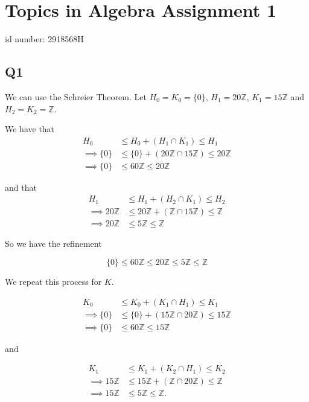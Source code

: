 \documentclass{amsart}
\begin{document}
    \section*{Topics in Algebra Assignment 1} 
    id number: 2918568H
    \hrulefill
    \subsection*{Q1} 
    We can use the Schreier Theorem. Let $H_0 = K_0 = \{0\}$, $H_1 = 20\mathbb{Z}$, $K_1 = 15\mathbb{Z}$ and $H_2 = K_2 = \mathbb{Z}$.

    We have that
    \begin{align*}
        H_0 &\leq H_0 + (H_1 \cap K_1) \leq H_1 \\
        \implies \{0\} &\leq \{0\}+ (20\mathbb{Z} \cap 15\mathbb{Z}) \leq 20\mathbb{Z} \\
        \implies \{0\} &\leq 60\mathbb{Z} \leq 20\mathbb{Z}
    \end{align*}

    and that 
    \begin{align*}
        H_1 &\leq H_1 + (H_2 \cap K_1) \leq H_2 \\
        \implies 20\mathbb{Z} &\leq 20\mathbb{Z} + (\mathbb{Z} \cap 15\mathbb{Z}) \leq \mathbb{Z} \\
        \implies 20\mathbb{Z} &\leq 5\mathbb{Z} \leq \mathbb{Z}
    \end{align*}

    So we have the refinement

    \[
        \{0\} \leq 60\mathbb{Z} \leq 20\mathbb{Z} \leq 5\mathbb{Z} \leq \mathbb{Z}
    \]

    We repeat this process for $K$.

    \begin{align*}
        K_0 &\leq K_0 + (K_1 \cap H_1) \leq K_1 \\
        \implies \{0\} &\leq \{0\}+ (15\mathbb{Z} \cap 20\mathbb{Z}) \leq 15\mathbb{Z} \\
        \implies \{0\} &\leq 60\mathbb{Z} \leq 15\mathbb{Z}
    \end{align*}

    and 

    \begin{align*}
        K_1 &\leq K_1 + (K_2 \cap H_1) \leq K_2 \\
        \implies 15\mathbb{Z} &\leq 15\mathbb{Z} + (\mathbb{Z} \cap 20\mathbb{Z}) \leq \mathbb{Z} \\
        \implies 15\mathbb{Z} &\leq 5\mathbb{Z} \leq \mathbb{Z}.
    \end{align*}
\end{document}
